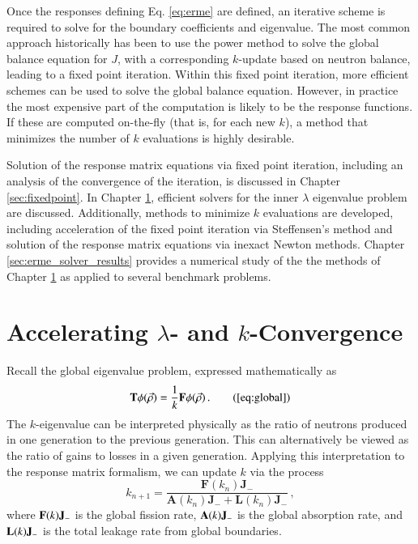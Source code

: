 Once the responses defining Eq. \ref{eq:erme}  are defined, an 
iterative scheme is 
required to solve for the boundary coefficients and eigenvalue.  The most
common approach historically has been to use the power method to solve the 
global balance equation for $J$, with a corresponding $k$-update 
based on neutron balance, leading to a fixed point iteration.  
Within this fixed point iteration, more efficient schemes can be 
used to solve the global balance equation.  
However, in practice the most expensive part of the computation is likely 
to be the response functions.  If these are computed on-the-fly (that is, 
for each new $k$), a method that minimizes the number of $k$ evaluations is
highly desirable.

Solution of the response matrix equations via fixed point iteration, 
including an analysis of the convergence of the iteration, is discussed
in Chapter \ref{sec:fixedpoint}.  In Chapter \ref{sec:newton}, efficient 
solvers for the inner $\lambda$ eigenvalue problem are discussed.
Additionally,
methods
to minimize $k$ evaluations are developed, including acceleration of the 
fixed point iteration via Steffensen's method and solution of the response 
matrix equations via inexact Newton methods.
Chapter \ref{sec:erme_solver_results} provides a numerical 
study of the the methods of  Chapter \ref{sec:newton} as applied 
to several benchmark problems.



\section{Accelerating $\lambda$- and $k$-Convergence}
\label{sec:newton}

Recall the global eigenvalue problem, expressed mathematically as
\begin{equation}
  \oper{T} \phi(\vec{\rho}) = \frac{1}{k} \oper{F} \phi(\vec{\rho}) \, .
  \tag{\ref{eq:global}}
\end{equation}
The $k$-eigenvalue can be interpreted physically as the ratio of neutrons
produced in one generation to the previous generation.  This can alternatively
be viewed as the ratio of gains to losses in a given generation. Applying this
interpretation to the response matrix formalism, we can update $k$ via the 
process
\begin{equation}
 k_{n+1} = \frac{\mathbf{F}(k_{n})\mathbf{J}_{-}} 
    { \mathbf{A}(k_{n}) \mathbf{J}_{-} + \mathbf{L}(k_{n}) \mathbf{J}_{-} }\, ,
\label{eq:picard}
\end{equation}
where $\mathbf{F}(k)\mathbf{J}_{-}$ is the global fission rate, 
$\mathbf{A}(k) \mathbf{J}_{-}$ is the global absorption rate,
and $\mathbf{L}(k) \mathbf{J}_{-}$ is the total leakage rate
from global boundaries.


